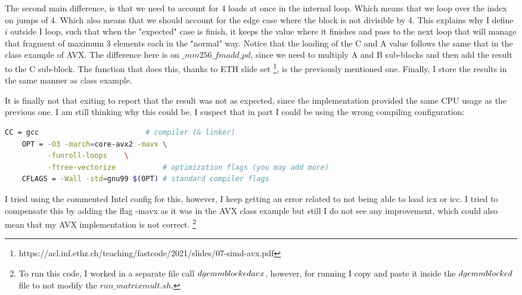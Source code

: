 \documentclass[unicode,11pt,a4paper,oneside,numbers=endperiod,openany]{scrartcl}
\begin{document}
The second main difference, is that we need to account for 4 loads at once in the internal loop. Which means that we loop over the index on jumps of 4. 
Which also means that we should account for the edge case where the block is not divisible by 4. This explains why I define $i$ outside I loop, such that when the 
"expected" case is finish, it keeps the value where it finishes and pass to the next loop that will manage that fragment of maximum 3 elements each in the "normal" way. 
Notice that the loading of the C and A value follows the same that in the class example of AVX. The difference here is on $\_mm256\_fmadd\_pd$, since we need to multiply A and B sub-blocks and then add the result to the C sub-block.
The function that does this, thanks to ETH slide set \footnote{https://acl.inf.ethz.ch/teaching/fastcode/2021/slides/07-simd-avx.pdf}, is the previously mentioned one. 
Finally, I store the results in the same manner as class example. 

It is finally not that exiting to report that the result was not as expected, since the implementation provided the same CPU usage as the previous one. I am still 
thinking why this could be. I suspect that in part I could be using the wrong compiling configuration: 

\begin{lstlisting}[language=bash, caption={Makefile example}]
    CC = gcc                         # compiler (& linker)
    OPT = -O3 -march=core-avx2 -mavx \
          -funroll-loops    \
          -ftree-vectorize           # optimization flags (you may add more)
    CFLAGS = -Wall -std=gnu99 $(OPT) # standard compiler flags
\end{lstlisting}
    
I tried using the commented Intel config for this, however, I keep getting an error related to not being able to 
load icx or icc. I tried to compensate this by adding the flag -mavx as it was in the AVX class example but still I do not see
any improvement, which could also mean that my AVX implementation is not correct. \footnote{To run this code, I worked in a separate
file call $dgemm\-blocked\-avx$, however, for running I copy and paste it inside the $dgemm\-blocked$ file to not modify the $run\_matrixmult.sh$.}
\end{document}
